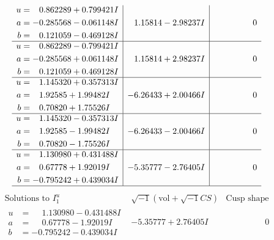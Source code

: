 \documentclass[1p]{elsarticle_modified}
\theoremstyle{definition}
\newcommand{\I}{\sqrt{-1}}
\begin{document}
$$\begin{array}{c|c|c}
\begin{aligned}
u &= \phantom{-}0.862289 + 0.799421 I \\
a &= -0.285568 - 0.061148 I \\
b &= \phantom{-}0.121059 - 0.469128 I\end{aligned}
 & \phantom{-}1.15814 - 2.98237 I & \phantom{-0.000000 } 0 \\ \hline\begin{aligned}
u &= \phantom{-}0.862289 - 0.799421 I \\
a &= -0.285568 + 0.061148 I \\
b &= \phantom{-}0.121059 + 0.469128 I\end{aligned}
 & \phantom{-}1.15814 + 2.98237 I & \phantom{-0.000000 } 0 \\ \hline\begin{aligned}
u &= \phantom{-}1.145320 + 0.357313 I \\
a &= \phantom{-}1.92585 + 1.99482 I \\
b &= \phantom{-}0.70820 + 1.75526 I\end{aligned}
 & -6.26433 + 2.00466 I & \phantom{-0.000000 } 0 \\ \hline\begin{aligned}
u &= \phantom{-}1.145320 - 0.357313 I \\
a &= \phantom{-}1.92585 - 1.99482 I \\
b &= \phantom{-}0.70820 - 1.75526 I\end{aligned}
 & -6.26433 - 2.00466 I & \phantom{-0.000000 } 0 \\ \hline\begin{aligned}
u &= \phantom{-}1.130980 + 0.431488 I \\
a &= \phantom{-}0.67778 + 1.92019 I \\
b &= -0.795242 + 0.439034 I\end{aligned}
 & -5.35777 - 2.76405 I & \phantom{-0.000000 } 0\\
 \hline 
 \end{array}$$\newpage$$\begin{array}{c|c|c}  
\text{Solutions to }I^u_{1}& \I (\text{vol} + \sqrt{-1}CS) & \text{Cusp shape}\\
 \hline 
\begin{aligned}
u &= \phantom{-}1.130980 - 0.431488 I \\
a &= \phantom{-}0.67778 - 1.92019 I \\
b &= -0.795242 - 0.439034 I\end{aligned}
 & -5.35777 + 2.76405 I & \phantom{-0.000000 } 0 \\ \hline\begin{aligned}

\end{aligned}
\end{array}$$
\end{document}
